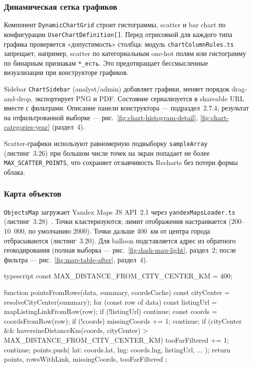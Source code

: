\subsubsection{Динамическая сетка графиков}

Компонент \texttt{DynamicChartGrid} строит гистограммы, scatter и bar chart по конфигурации \texttt{UserChartDefinition[]}. Перед отрисовкой для каждого типа графика проверяется «допустимость» столбца: модуль \texttt{chartColumnRules.ts} запрещает, например, scatter по категориальным one-hot полям или гистограмму по бинарным признакам \texttt{*\_есть}. Это предотвращает бессмысленные визуализации при конструкторе графиков.

Sidebar \texttt{ChartSidebar} (analyst/admin) добавляет графики, меняет порядок drag-and-drop, экспортирует PNG и PDF. Состояние сериализуется в shareable URL вместе с фильтрами. Описание панели конструктора --- подраздел~2.7.4; результат на отфильтрованной выборке --- рис.~\ref{fig:chart-histogram-detail}, \ref{fig:chart-categories-year} (раздел~4).

Scatter-графики используют равномерную подвыборку \texttt{sampleArray} (листинг~3.26) при большом числе точек на экран попадает не более \texttt{MAX\_SCATTER\_POINTS}, что сохраняет отзывчивость Recharts без потери формы облака.

\subsubsection{Карта объектов}

\texttt{ObjectsMap} загружает Yandex Maps JS API~2.1 через \texttt{yandexMapsLoader.ts} (листинг~3.28)~\cite{yandex-maps-api}. Точки кластеризуются; лимит отображения настраивается (200--10~000, по умолчанию 2000). Точки дальше 400~км от центра города отбрасываются (листинг~3.20). Для balloon подставляется адрес из обратного геокодирования (полная выборка --- рис.~\ref{fig:dash-map-light}, раздел~2; после фильтра --- рис.~\ref{fig:map-table-after}, раздел~4).

\begin{singleminted}{typescript}
const MAX_DISTANCE_FROM_CITY_CENTER_KM = 400;

function pointsFromRows(data, summary, coordsCache) {
    const cityCenter = resolveCityCenter(summary);
    for (const row of data) {
        const listingUrl = mapListingLinkFromRow(row);
        if (!listingUrl) continue;
        const coords = coordsFromRow(row);
        if (!coords) { missingCoords += 1; continue; }
        if (cityCenter && haversineDistanceKm(coords, cityCenter)
            > MAX_DISTANCE_FROM_CITY_CENTER_KM) {
            tooFarFiltered += 1;
            continue;
        }
        points.push({ lat: coords.lat, lng: coords.lng, listingUrl, ... });
    }
    return { points, rowsWithLink, missingCoords, tooFarFiltered };
}
\end{singleminted}
\label{lst:objects-map}


